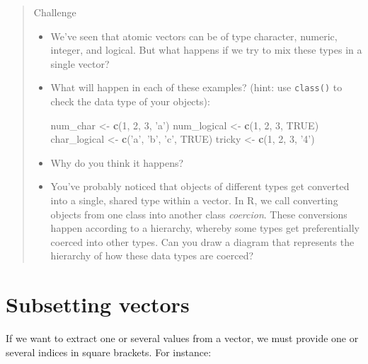 \documentclass[]{book}
\newenvironment{Shaded}{\begin{snugshade}}{\end{snugshade}}
\newcommand{\KeywordTok}[1]{\textcolor[rgb]{0.13,0.29,0.53}{\textbf{{#1}}}}
\newcommand{\DecValTok}[1]{\textcolor[rgb]{0.00,0.00,0.81}{{#1}}}
\newcommand{\StringTok}[1]{\textcolor[rgb]{0.31,0.60,0.02}{{#1}}}
\newcommand{\OtherTok}[1]{\textcolor[rgb]{0.56,0.35,0.01}{{#1}}}
\newcommand{\NormalTok}[1]{{#1}}
\theoremstyle{definition}
\theoremstyle{definition}
\theoremstyle{remark}
\begin{document}
\begin{quote}
Challenge

\begin{itemize}
\item
  We've seen that atomic vectors can be of type character, numeric,
  integer, and logical. But what happens if we try to mix these types in
  a single vector? 
\item
  What will happen in each of these examples? (hint: use
  \texttt{class()} to check the data type of your objects):

\begin{Shaded}
\begin{Highlighting}[]
\NormalTok{num_char <-}\StringTok{ }\KeywordTok{c}\NormalTok{(}\DecValTok{1}\NormalTok{, }\DecValTok{2}\NormalTok{, }\DecValTok{3}\NormalTok{, }\StringTok{'a'}\NormalTok{)}
\NormalTok{num_logical <-}\StringTok{ }\KeywordTok{c}\NormalTok{(}\DecValTok{1}\NormalTok{, }\DecValTok{2}\NormalTok{, }\DecValTok{3}\NormalTok{, }\OtherTok{TRUE}\NormalTok{)}
\NormalTok{char_logical <-}\StringTok{ }\KeywordTok{c}\NormalTok{(}\StringTok{'a'}\NormalTok{, }\StringTok{'b'}\NormalTok{, }\StringTok{'c'}\NormalTok{, }\OtherTok{TRUE}\NormalTok{)}
\NormalTok{tricky <-}\StringTok{ }\KeywordTok{c}\NormalTok{(}\DecValTok{1}\NormalTok{, }\DecValTok{2}\NormalTok{, }\DecValTok{3}\NormalTok{, }\StringTok{'4'}\NormalTok{)}
\end{Highlighting}
\end{Shaded}
\item
  Why do you think it happens? 
\item
  You've probably noticed that objects of different types get converted
  into a single, shared type within a vector. In R, we call converting
  objects from one class into another class \emph{coercion}. These
  conversions happen according to a hierarchy, whereby some types get
  preferentially coerced into other types. Can you draw a diagram that
  represents the hierarchy of how these data types are coerced? 
\end{itemize}
\end{quote}

\section{Subsetting vectors}\label{subsetting-vectors}

If we want to extract one or several values from a vector, we must
provide one or several indices in square brackets. For instance:
\end{document}
